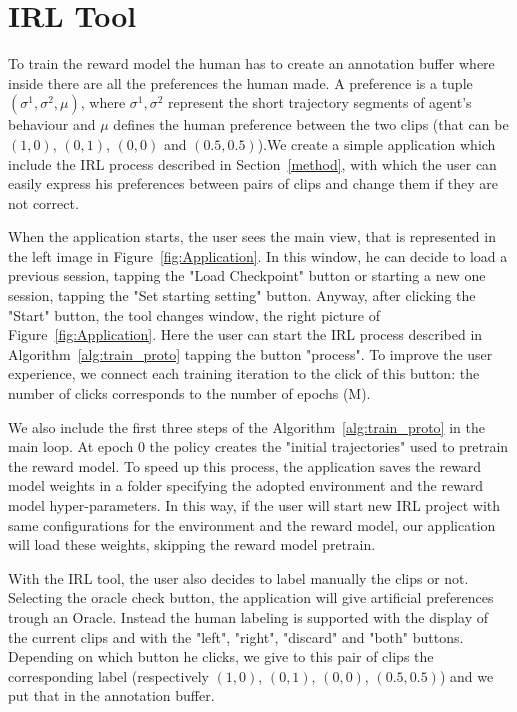 \section{IRL Tool}\label{04}

To train the reward model the human has to create an annotation buffer where inside there are all the preferences the human made. A preference is a tuple $( \sigma^1, \sigma^2, \mu)$, where $\sigma^1, \sigma^2$ represent the short trajectory segments of agent's behaviour and $\mu$ defines the human preference between the two clips (that can be $(1, 0)$, $(0, 1)$, $(0, 0)$ and $(0.5, 0.5)$).We create a simple application which include the IRL process described in Section\ \ref{method}, with which the user can easily express his preferences between pairs of clips and change them if they are not correct.

When the application starts, the user sees the main view, that is represented in the left image in Figure\ \ref{fig:Application}.
In this window, he can decide to load a previous session, tapping the "Load Checkpoint" button or starting a new one session, tapping the "Set starting setting" button. Anyway, after clicking the "Start" button, the tool changes window, the right picture of Figure\ \ref{fig:Application}. Here the user can start the IRL process described in Algorithm\ \ref{alg:train_proto} tapping the button "process".
To improve the user experience, we connect each training iteration to the click of this button: the number of clicks corresponds to the number of epochs (M).

We also include the first three steps of the Algorithm\ \ref{alg:train_proto} in the main loop. At epoch $0$ the policy creates the "initial trajectories" used to pretrain the reward model. To speed up this process, the application saves the reward model weights in a folder specifying the adopted environment and the reward model hyper-parameters. In this way, if the user will start new IRL project with same configurations for the environment and the reward model, our application will load these weights, skipping the reward model pretrain.

With the IRL tool, the user also decides to label manually the clips or not. Selecting the oracle check button, the application will give artificial preferences trough an Oracle. Instead the human labeling is supported with the display of the current clips and with the "left", "right", "discard" and "both" buttons. Depending on which button he clicks, we give to this pair of clips the corresponding label (respectively $(1, 0)$, $(0, 1)$, $(0, 0)$, $(0.5, 0.5)$) and we put that in the annotation buffer. 

